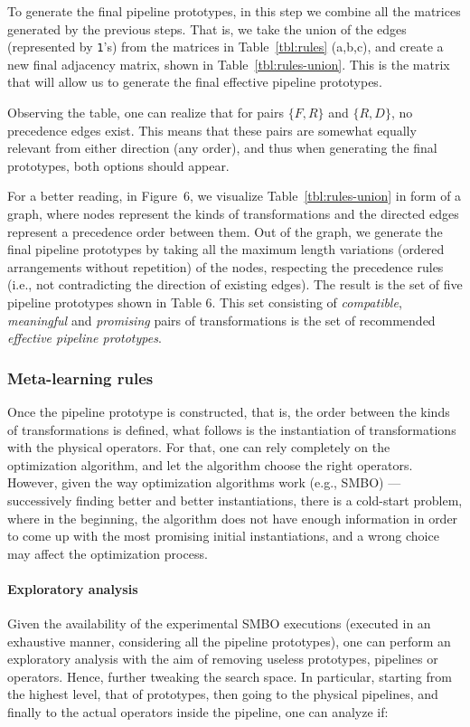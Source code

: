 \begin{example}
To generate the final pipeline prototypes, in this step we combine all the matrices generated by the previous steps. That is, we take the union of the edges (represented by \texttt{1}'s) from the matrices in Table~\ref{tbl:rules} (a,b,c), and create a new final adjacency matrix, shown in Table~\ref{tbl:rules-union}. This is the matrix that will allow us to generate the final effective pipeline prototypes. 

Observing the table, one can realize that for pairs $\{F,R\}$ and $\{R,D\}$, no precedence edges exist. This means that these pairs are somewhat equally relevant from either direction (any order), and thus when generating the final prototypes, both options should appear.

For a better reading, in Figure~6, we visualize Table~\ref{tbl:rules-union} in form of a graph, where nodes represent the kinds of transformations and the directed edges represent a precedence order between them.
Out of the graph, we generate the final pipeline prototypes by taking all the maximum length variations (ordered arrangements without repetition) of the nodes, respecting the precedence rules (i.e., not contradicting the direction of existing edges). The result is the set of five pipeline prototypes shown in Table 6. This set consisting of \textit{compatible}, \textit{meaningful} and \textit{promising} pairs of transformations is the set of recommended \textit{effective pipeline prototypes}.
\end{example}

\color{black}
\subsubsection{Meta-learning rules}
\label{ssec:meta-learning}
Once the pipeline prototype is constructed, that is, the order between the kinds of transformations is defined, what follows is the instantiation of transformations with the physical operators. For that, one can rely completely on the optimization algorithm, and let the algorithm choose the right operators. However, given the way optimization algorithms work (e.g., SMBO) --- successively finding better and better instantiations, there is a cold-start problem, where in the beginning, the algorithm does not have enough information in order to come up with the most promising initial instantiations, and a wrong choice may affect the optimization process. 
\paragraph{Exploratory analysis}
Given the availability of the experimental SMBO executions (executed in an exhaustive manner, considering all the pipeline prototypes), one can perform an exploratory analysis with the aim of removing useless prototypes, pipelines or operators. Hence, further tweaking the search space. In particular, starting from the highest level, that of prototypes, then going to the physical pipelines, and finally to the actual operators inside the pipeline, one can analyze if:


